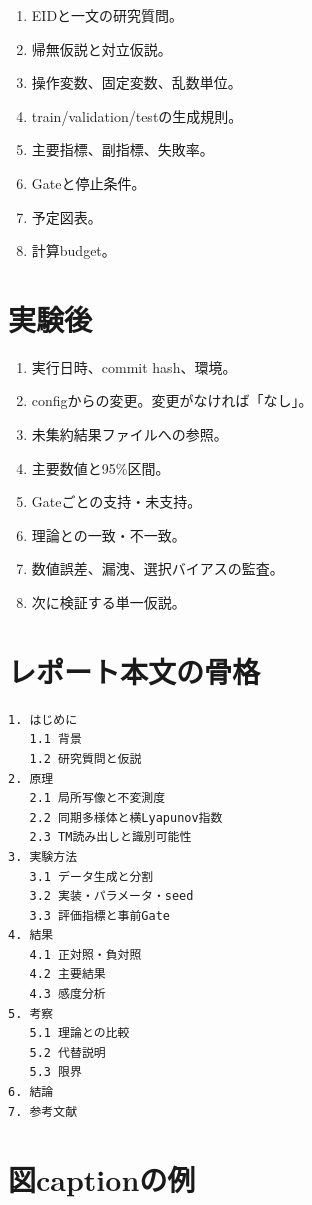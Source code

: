 \documentclass[a4paper,11pt,oneside,openany]{ltjsbook}
\newcommand{\Gate}{\textsf{Gate}}
\begin{document}
\begin{enumerate}
  \item EIDと一文の研究質問。
  \item 帰無仮説と対立仮説。
  \item 操作変数、固定変数、乱数単位。
  \item train/validation/testの生成規則。
  \item 主要指標、副指標、失敗率。
  \item \Gate と停止条件。
  \item 予定図表。
  \item 計算budget。
\end{enumerate}

\section{実験後}

\begin{enumerate}
  \item 実行日時、commit hash、環境。
  \item configからの変更。変更がなければ「なし」。
  \item 未集約結果ファイルへの参照。
  \item 主要数値と95\%区間。
  \item \Gate ごとの支持・未支持。
  \item 理論との一致・不一致。
  \item 数値誤差、漏洩、選択バイアスの監査。
  \item 次に検証する単一仮説。
\end{enumerate}

\section{レポート本文の骨格}

\begin{Verbatim}[fontsize=\small,frame=single]
1. はじめに
   1.1 背景
   1.2 研究質問と仮説
2. 原理
   2.1 局所写像と不変測度
   2.2 同期多様体と横Lyapunov指数
   2.3 TM読み出しと識別可能性
3. 実験方法
   3.1 データ生成と分割
   3.2 実装・パラメータ・seed
   3.3 評価指標と事前Gate
4. 結果
   4.1 正対照・負対照
   4.2 主要結果
   4.3 感度分析
5. 考察
   5.1 理論との比較
   5.2 代替説明
   5.3 限界
6. 結論
7. 参考文献
\end{Verbatim}

\section{図captionの例}
\end{document}
